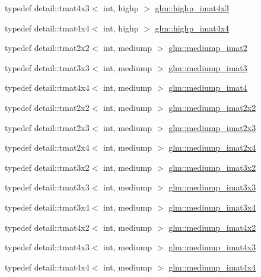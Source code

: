 \begin{CompactItemize}
typedef detail::tmat4x3$<$ int, highp $>$ \hyperlink{group__gtc__matrix__integer_g9d51b6f1c8cd0b23c6fcc8dca924b14c}{glm::highp\_\-imat4x3}
\item 
typedef detail::tmat4x4$<$ int, highp $>$ \hyperlink{group__gtc__matrix__integer_g969c88d5c7530beb80768205a054ee80}{glm::highp\_\-imat4x4}
\item 
typedef detail::tmat2x2$<$ int, mediump $>$ \hyperlink{group__gtc__matrix__integer_gec03a8eef2ec2536f8bebffd0bac8192}{glm::mediump\_\-imat2}
\item 
typedef detail::tmat3x3$<$ int, mediump $>$ \hyperlink{group__gtc__matrix__integer_g6b438ab863af0122b532adc93b89105e}{glm::mediump\_\-imat3}
\item 
typedef detail::tmat4x4$<$ int, mediump $>$ \hyperlink{group__gtc__matrix__integer_gbf1a0fd4c85a21f67535b737e1feb355}{glm::mediump\_\-imat4}
\item 
typedef detail::tmat2x2$<$ int, mediump $>$ \hyperlink{group__gtc__matrix__integer_g472222f6e3754124ee9cb64acaaedac1}{glm::mediump\_\-imat2x2}
\item 
typedef detail::tmat2x3$<$ int, mediump $>$ \hyperlink{group__gtc__matrix__integer_gbc92c714c2d257213c5b0771669df177}{glm::mediump\_\-imat2x3}
\item 
typedef detail::tmat2x4$<$ int, mediump $>$ \hyperlink{group__gtc__matrix__integer_g90b020de8489a1d4424c0ffcc17c83dd}{glm::mediump\_\-imat2x4}
\item 
typedef detail::tmat3x2$<$ int, mediump $>$ \hyperlink{group__gtc__matrix__integer_g2a90775c74656b8a825f24d510f0ea5d}{glm::mediump\_\-imat3x2}
\item 
typedef detail::tmat3x3$<$ int, mediump $>$ \hyperlink{group__gtc__matrix__integer_gc5ee8dc182055bb0a00a90c031d4a714}{glm::mediump\_\-imat3x3}
\item 
typedef detail::tmat3x4$<$ int, mediump $>$ \hyperlink{group__gtc__matrix__integer_gaac79be4db34dde570c3331ffe728d55}{glm::mediump\_\-imat3x4}
\item 
typedef detail::tmat4x2$<$ int, mediump $>$ \hyperlink{group__gtc__matrix__integer_gcdae7d6ae4820756c62c2b5fd5c0370a}{glm::mediump\_\-imat4x2}
\item 
typedef detail::tmat4x3$<$ int, mediump $>$ \hyperlink{group__gtc__matrix__integer_g5032ee978a55aa0db4842d5c3cbeade0}{glm::mediump\_\-imat4x3}
\item 
typedef detail::tmat4x4$<$ int, mediump $>$ \hyperlink{group__gtc__matrix__integer_gfa2df6be3aad055867b9bfea34e9c4a0}{glm::mediump\_\-imat4x4}
\item 

\end{CompactItemize}
